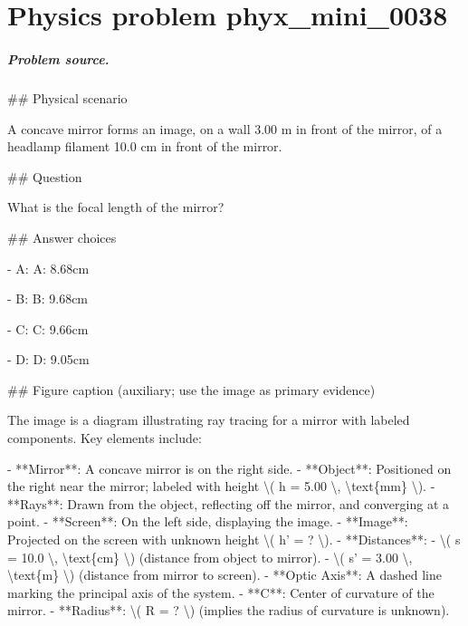 
\chapter{Physics problem phyx\_mini\_0038}
\label{ch:PhyXMiniProblems_problem_phyx_mini_0038}

\paragraph{Problem source.}
\#\# Physical scenario

A concave mirror forms an image, on a wall 3.00 m in front of the mirror, of a headlamp filament 10.0 cm in front of the mirror.

\#\# Question

What is the focal length of the mirror?

\#\# Answer choices

- A: A: 8.68cm

- B: B: 9.68cm

- C: C: 9.66cm

- D: D: 9.05cm

\#\# Figure caption (auxiliary; use the image as primary evidence)

The image is a diagram illustrating ray tracing for a mirror with labeled components. Key elements include:

- **Mirror**: A concave mirror is on the right side.
- **Object**: Positioned on the right near the mirror; labeled with height \textbackslash{}( h = 5.00 \textbackslash{}, \textbackslash{}text\{mm\} \textbackslash{}).
- **Rays**: Drawn from the object, reflecting off the mirror, and converging at a point.
- **Screen**: On the left side, displaying the image.
- **Image**: Projected on the screen with unknown height \textbackslash{}( h' = ? \textbackslash{}).
- **Distances**: 
  - \textbackslash{}( s = 10.0 \textbackslash{}, \textbackslash{}text\{cm\} \textbackslash{}) (distance from object to mirror).
  - \textbackslash{}( s' = 3.00 \textbackslash{}, \textbackslash{}text\{m\} \textbackslash{}) (distance from mirror to screen).
- **Optic Axis**: A dashed line marking the principal axis of the system.
- **C**: Center of curvature of the mirror.
- **Radius**: \textbackslash{}( R = ? \textbackslash{}) (implies the radius of curvature is unknown).

